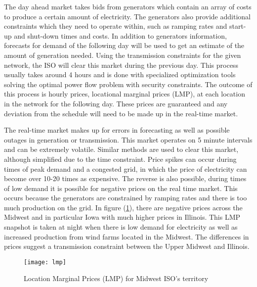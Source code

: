 The day ahead market takes bids from generators which contain an array of costs to produce a certain amount of electricity.  The generators also provide additional constraints which they need to operate within, such as ramping rates and start-up and shut-down times and costs.  In addition to generators information, forecasts for demand of the following day will be used to get an estimate of the amount of generation needed.  Using the transmission constraints for the given network, the ISO will clear this market during the previous day.  This process usually takes around 4 hours and is done with specialized optimization tools solving the optimal power flow problem with security constraints.  The outcome of this process is hourly prices, locational marginal prices (LMP), at each location in the network for the following day.  These prices are guaranteed and any deviation from the schedule will need to be made up in the real-time market.	

The real-time market makes up for errors in forecasting as well as possible outages in generation or transmission.  This market operates on 5 minute intervals and can be extremely volatile.  Similar methods are used to clear this market, although simplified due to the time constraint.  Price spikes can occur during times of peak demand and a congested grid, in which the price of electricity can become over 10-20 times as expensive.  The reverse is also possible, during times of low demand it is possible for negative prices on the real time market.  This occurs because the generators are constrained by ramping rates and there is too much production on the grid. In figure (\ref{fig:lmpmiso}), there are negative prices across the Midwest and in particular Iowa with much higher prices in Illinois.  This LMP snapshot is taken at night when there is low demand for electricity as well as increased production from wind farms located in the Midwest.  The differences in prices suggest a transmission constraint between the Upper Midwest and Illinois.    


\begin{figure}
\centering
\texttt{[image: lmp]}  
\caption{Location Marginal Prices (LMP) for Midwest ISO's territory}
\label{fig:lmpmiso}
\end{figure}

